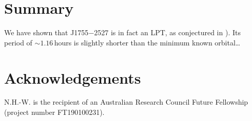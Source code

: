 \documentclass[fleqn,usenatbib]{mnras}
\newcommand{\src}{J1755$-$2527}
\begin{document}



\section{Summary} \label{sec:summary}

We have shown that \src{} is in fact an LPT, as conjectured in ).
Its period of ${\sim}1.16\,$hours is slightly shorter than the minimum known orbital\dots

\section*{Acknowledgements}

N.H.-W. is the recipient of an Australian Research Council Future Fellowship (project number FT190100231).
 
\end{document}
